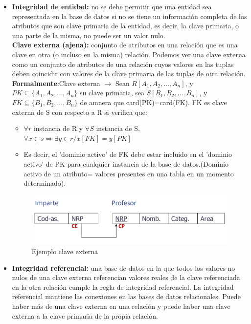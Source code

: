 \documentclass[a4paper,11pt]{article}
\begin{document}
\begin{itemize}
\item \textbf{Integridad de entidad:} no se debe permitir que una entidad sea representada en la base de datos si no se tiene un información completa de los atributos que son clave primaria de la entidad, es decir, la clave primaria, o una parte de la misma, no puede ser un valor nulo. \\

\textbf{Clave externa (ajena):} conjunto de atributos en una relación que es una clave en otra (o incluso en la misma) relación. Podemos ver una clave externa como un conjunto de atributos de una relación cuyos valores en las tuplas deben coincidir con valores de la clave primaria de las tuplas de otra relación. \\

\textbf{Formalmente}:Clave externa $\rightarrow$ Sean $R[A_1,A_2,\ldots,A_n]$, y $PK\subseteq \{A_1,A_2,\ldots,A_n\}$ su clave primaria, sea $S[B_1,B_2,\ldots,B_n]$, y $FK\subseteq \{B_1,B_2,\ldots,B_n\}$ de amnera que card(PK)=card(FK). FK es clave externa de S con respecto a R si verifica que:
	\begin{itemize}
		\item $\forall r$ instancia de R y $\forall S$ instancia de S, $\forall x \in s \Rightarrow \exists y\in r / x[FK]=y[PK]$
		\item Es decir, el 'dominio activo' de FK debe estar incluido en el 'dominio activo' de PK para cualquier instancia de la base de datos.(Dominio activo de un atributo= valores presentes en una tabla en un momento determinado).
	\end{itemize}
	
\begin{figure}[h]
\centering
\includegraphics[scale=1,width=1\textwidth]{ejemplo_clave_externa.png}
\caption{Ejemplo clave externa}
\end{figure}

\item \textbf{Integridad referencial:} una base de datos en la que todos los valores no nulos de una clave externa referencian valores reales de la clave referenciada en la otra relación cumple la regla de integridad referencial. La integridad referencial mantiene las conexiones en las bases de datos relacionales. Puede haber más de una clave externa en una relación y puede haber una clave externa a la clave primaria de la propia relación.


\end{itemize}
\end{document}

